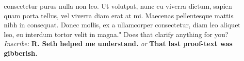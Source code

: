 \documentclass[11pt,letterpaper,openany]{scrbook}
\begin{document}
\begin{sloppypar}
\begin{paracol}{2}
\end{paracol}



\begin{paracol}{1}

\fontsize{11}{13}\leftfont consectetur purus nulla non leo. Ut volutpat, nunc eu viverra dictum, sapien quam porta tellus, vel viverra diam erat at mi. Maecenas pellentesque mattis nibh in consequat. Donec mollis, ex a ullamcorper consectetur, diam leo aliquet leo, eu interdum tortor velit in magna." Does that clarify anything for you?  \leftfont \textit{Inscribe:} \textbf{R. Seth helped me understand.} \textit{or} \textbf{That last proof-text was gibberish.}

\end{paracol}

\end{sloppypar}
\end{document}
